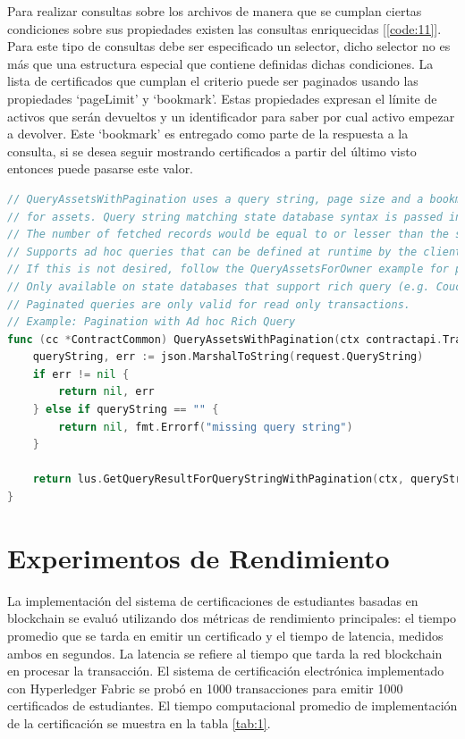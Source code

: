 Para realizar consultas sobre los archivos de manera que se cumplan ciertas condiciones sobre sus propiedades existen las consultas enriquecidas [\ref{code:11}]. Para este tipo de consultas debe ser especificado un selector, dicho selector no es más que una estructura especial que contiene definidas dichas condiciones. La lista de certificados que cumplan el criterio puede ser paginados usando las propiedades `pageLimit' y `bookmark'. Estas propiedades expresan el límite de activos que serán devueltos y un identificador para saber por cual activo empezar a devolver. Este `bookmark' es entregado como parte de la respuesta a la consulta, si se desea seguir mostrando certificados a partir del último visto entonces puede pasarse este valor.

\begin{lstlisting}[language=Go,caption={Código del archivo App.vue}, label={code:11}]
// QueryAssetsWithPagination uses a query string, page size and a bookmark to perform a query
// for assets. Query string matching state database syntax is passed in and executed as is.
// The number of fetched records would be equal to or lesser than the specified page size.
// Supports ad hoc queries that can be defined at runtime by the client.
// If this is not desired, follow the QueryAssetsForOwner example for parameterized queries.
// Only available on state databases that support rich query (e.g. CouchDB)
// Paginated queries are only valid for read only transactions.
// Example: Pagination with Ad hoc Rich Query
func (cc *ContractCommon) QueryAssetsWithPagination(ctx contractapi.TransactionContextInterface, request lus.RichQuerySelector) (*lus.PaginatedQueryResponse, error) {
	queryString, err := json.MarshalToString(request.QueryString)
	if err != nil {
		return nil, err
	} else if queryString == "" {
		return nil, fmt.Errorf("missing query string")
	}
	
	return lus.GetQueryResultForQueryStringWithPagination(ctx, queryString, int32(request.PageSize), request.Bookmark)
}
\end{lstlisting}

\section{Experimentos de Rendimiento}

La implementación del sistema de certificaciones de estudiantes basadas en blockchain se evaluó utilizando dos métricas de rendimiento principales: el tiempo promedio que se tarda en emitir un certificado y el tiempo de latencia, medidos ambos en segundos. La latencia se refiere al tiempo que tarda la red blockchain en procesar la transacción. El sistema de certificación electrónica implementado con Hyperledger Fabric se probó en 1000 transacciones para emitir 1000 certificados de estudiantes. El tiempo computacional promedio de implementación de la certificación se muestra en la tabla \ref{tab:1}.

